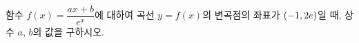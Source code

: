 함수 $f(x)=\dfrac{ax+b}{e^x}$에 대하여 곡선 $y=f(x)$의 변곡점의 좌표가 $(-1{,}\mkern3mu\mathopen{}2e)$일 때, 상수 $a$, $b$의 값을 구하시오.
